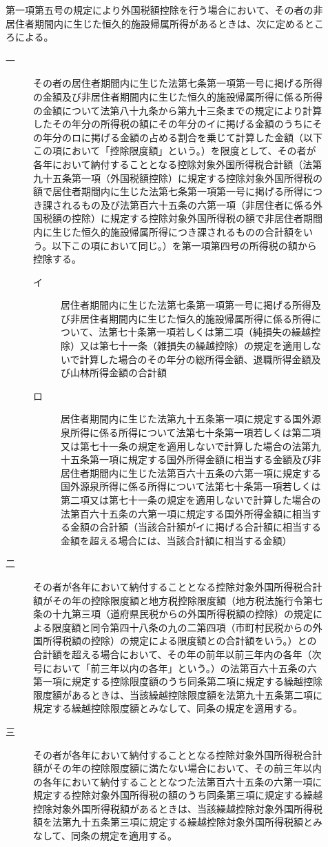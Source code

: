 \documentclass[twocolumn,a4j,10pt]{ltjtarticle}
\begin{document}
\begin{description}
\item[]第一項第五号の規定により外国税額控除を行う場合において、その者の非居住者期間内に生じた恒久的施設帰属所得があるときは、次に定めるところによる。
\begin{description}
\item[一]その者の居住者期間内に生じた法第七条第一項第一号に掲げる所得の金額及び非居住者期間内に生じた恒久的施設帰属所得に係る所得の金額について法第八十九条から第九十三条までの規定により計算したその年分の所得税の額にその年分のイに掲げる金額のうちにその年分のロに掲げる金額の占める割合を乗じて計算した金額（以下この項において「控除限度額」という。）を限度として、その者が各年において納付することとなる控除対象外国所得税合計額（法第九十五条第一項（外国税額控除）に規定する控除対象外国所得税の額で居住者期間内に生じた法第七条第一項第一号に掲げる所得につき課されるもの及び法第百六十五条の六第一項（非居住者に係る外国税額の控除）に規定する控除対象外国所得税の額で非居住者期間内に生じた恒久的施設帰属所得につき課されるものの合計額をいう。以下この項において同じ。）を第一項第四号の所得税の額から控除する。
\begin{description}
\item[イ]居住者期間内に生じた法第七条第一項第一号に掲げる所得及び非居住者期間内に生じた恒久的施設帰属所得に係る所得について、法第七十条第一項若しくは第二項（純損失の繰越控除）又は第七十一条（雑損失の繰越控除）の規定を適用しないで計算した場合のその年分の総所得金額、退職所得金額及び山林所得金額の合計額
\item[ロ]居住者期間内に生じた法第九十五条第一項に規定する国外源泉所得に係る所得について法第七十条第一項若しくは第二項又は第七十一条の規定を適用しないで計算した場合の法第九十五条第一項に規定する国外所得金額に相当する金額及び非居住者期間内に生じた法第百六十五条の六第一項に規定する国外源泉所得に係る所得について法第七十条第一項若しくは第二項又は第七十一条の規定を適用しないで計算した場合の法第百六十五条の六第一項に規定する国外所得金額に相当する金額の合計額（当該合計額がイに掲げる合計額に相当する金額を超える場合には、当該合計額に相当する金額）
\end{description}
\item[二]その者が各年において納付することとなる控除対象外国所得税合計額がその年の控除限度額と地方税控除限度額（地方税法施行令第七条の十九第三項（道府県民税からの外国所得税額の控除）の規定による限度額と同令第四十八条の九の二第四項（市町村民税からの外国所得税額の控除）の規定による限度額との合計額をいう。）との合計額を超える場合において、その年の前年以前三年内の各年（次号において「前三年以内の各年」という。）の法第百六十五条の六第一項に規定する控除限度額のうち同条第二項に規定する繰越控除限度額があるときは、当該繰越控除限度額を法第九十五条第二項に規定する繰越控除限度額とみなして、同条の規定を適用する。
\item[三]その者が各年において納付することとなる控除対象外国所得税合計額がその年の控除限度額に満たない場合において、その前三年以内の各年において納付することとなつた法第百六十五条の六第一項に規定する控除対象外国所得税の額のうち同条第三項に規定する繰越控除対象外国所得税額があるときは、当該繰越控除対象外国所得税額を法第九十五条第三項に規定する繰越控除対象外国所得税額とみなして、同条の規定を適用する。
\end{description}
\end{description}
\end{document}
